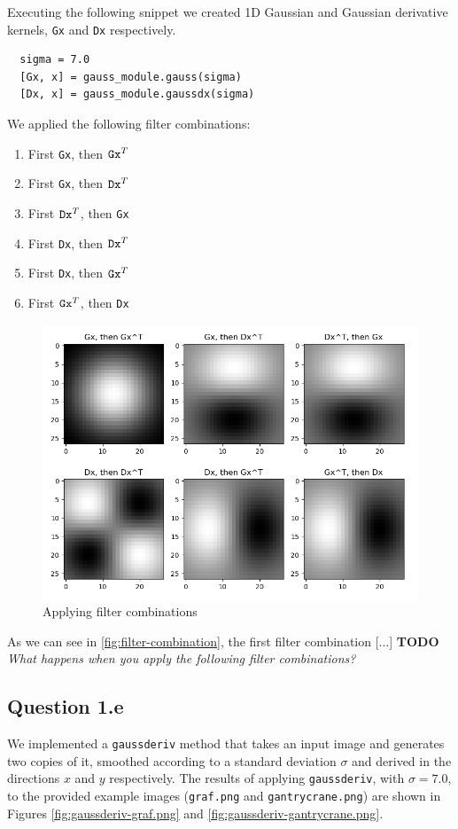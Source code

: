 \documentclass{article}
\begin{document}
\noindent
Executing the following snippet we created 1D Gaussian and Gaussian derivative kernels, \verb|Gx| and \verb|Dx| respectively.
\begin{verbatim}
  sigma = 7.0
  [Gx, x] = gauss_module.gauss(sigma)
  [Dx, x] = gauss_module.gaussdx(sigma)
\end{verbatim}
We applied the following filter combinations:
\begin{enumerate}
    \item First \verb|Gx|, then $ \verb|Gx|^T $
    \item First \verb|Gx|, then $ \verb|Dx|^T $
    \item First $ \verb|Dx|^T $, then \verb|Gx|
    \item First \verb|Dx|, then $ \verb|Dx|^T $
    \item First \verb|Dx|, then $ \verb|Gx|^T $
    \item First $ \verb|Gx|^T $, then \verb|Dx|
\end{enumerate}

\begin{figure}[ht]
    \centering
    \includegraphics[width=\textwidth]{images/Q1.d-F2.png}
    \caption{Applying filter combinations}
    \label{fig:filter-combination}
\end{figure}

\noindent
As we can see in \autoref{fig:filter-combination}, the first filter combination [...]
\newline
{\color{red} \large \textbf{TODO}} \textit{What happens when you apply the following filter combinations?}

\subsection{Question 1.e}
We implemented a \verb|gaussderiv| method that takes an input image and generates two copies of it, smoothed according to a standard deviation $\sigma$ and derived in the directions $x$ and $y$ respectively.
\newline
\newline
The results of applying \verb|gaussderiv|, with $\sigma = 7.0$, to the provided example images (\verb|graf.png| and \verb|gantrycrane.png|) are shown in Figures \ref{fig:gaussderiv-graf.png} and \ref{fig:gaussderiv-gantrycrane.png}.
\end{document}
